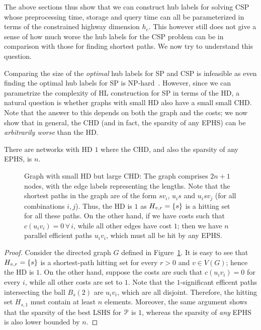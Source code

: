 The above sections thus show that we can construct hub labels for solving CSP whose preprocessing time, storage and query time can all be parameterized in terms of the constrained highway dimension $h_c$. 
This however still does not give a sense of how much worse the hub labels for the CSP problem can be in comparison with those for finding shortest paths. 
We now try to understand this question.

Comparing the size of the \emph{optimal} hub labels for SP and CSP is infeasible as even finding the optimal hub labels for SP is NP-hard~\cite{babenko_hl_complexity}. However, since we can parametrize the complexity of HL construction for SP in terms of the HD, a natural question is whether graphs with small HD also have a small small CHD. Note that the answer to this depends on both the graph and the costs; we now show that in general, the CHD (and in fact, the sparsity of any EPHS) can be \emph{arbitrarily worse} than the HD. 
\begin{proposition}
There are networks with HD $1$ where the CHD, and also the sparsity of any EPHS, is $n$.
\end{proposition}

\begin{figure}

\caption{Graph with small HD but large CHD: The graph comprises $2n+1$ nodes, with the edge labels representing the lengths. Note that the shortest paths in the graph are of the form $sv_i$, $u_is$ and $u_isv_j$ (for all combinations $i,j$). Thus, the HD is $1$ as $H_{v,r}=\{s\}$ is a hitting set for all these paths. On the other hand, if we have costs such that $c(u_iv_i)=0\,\forall\,i$, while all other edges have cost $1$; then we have $n$ parallel efficient paths $u_iv_i$, which must all be hit by any EPHS.}
\label{fig:big_chd}
\end{figure}

\begin{proof}
Consider the directed graph $G$ defined in Figure~\ref{fig:big_chd}.
It is easy to see that $H_{v,r}=\{s\}$ is a shortest-path hitting set for every $r>0$ and $v\in V(G)$; hence the HD is $1$.
On the other hand, suppose the costs are such that $c(u_iv_i)=0$ for every $i$, while all other costs are set to $1$.
Note that the $1$-significant efficent paths intersecting the ball $B_s(2)$ are $u_iv_i$, which are all disjoint.
Therefore, the hitting set $H_{s,1}$ must contain at least $n$ elements. Moreover, the same argument shows that the sparsity of the best LSHS for $\mathcal{P}$ is $1$, whereas the sparsity of \emph{any} EPHS is also lower bounded by $n$.
\end{proof}

